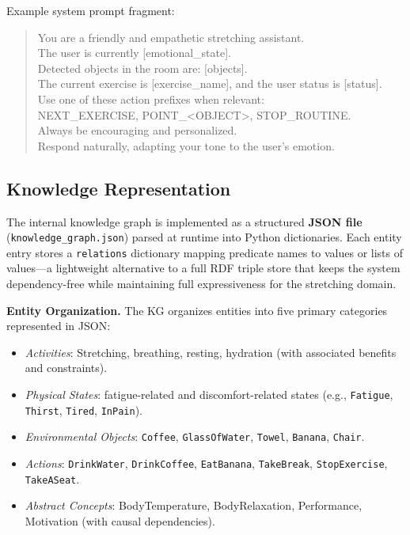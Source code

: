 \documentclass[pdflatex,sn-basic,Numbered,iicol,twocolumn]{sn-jnl}%
\begin{document}
Example system prompt fragment:
\begin{quote}
\small\ttfamily
You are a friendly and empathetic stretching assistant.\\
The user is currently [emotional\_state].\\
Detected objects in the room are: [objects].\\
The current exercise is [exercise\_name], and the user status is [status].\\
Use one of these action prefixes when relevant:\\
NEXT\_EXERCISE, POINT\_<OBJECT>, STOP\_ROUTINE.\\
Always be encouraging and personalized.\\
Respond naturally, adapting your tone to the user's emotion.
\end{quote}

\subsection{Knowledge Representation}

The internal knowledge graph is implemented as a structured \textbf{JSON file} (\texttt{knowledge\_graph.json}) parsed at runtime into Python dictionaries. Each entity entry stores a \texttt{relations} dictionary mapping predicate names to values or lists of values—a lightweight alternative to a full RDF triple store that keeps the system dependency-free while maintaining full expressiveness for the stretching domain.

\textbf{Entity Organization.} The KG organizes entities into five primary categories represented in JSON:

\begin{itemize}
\item \textit{Activities}: Stretching, breathing, resting, hydration (with associated benefits and constraints).
\item \textit{Physical States}: fatigue-related and discomfort-related states (e.g., \texttt{Fatigue}, \texttt{Thirst}, \texttt{Tired}, \texttt{InPain}).
\item \textit{Environmental Objects}: \texttt{Coffee}, \texttt{GlassOfWater}, \texttt{Towel}, \texttt{Banana}, \texttt{Chair}.
\item \textit{Actions}: \texttt{DrinkWater}, \texttt{DrinkCoffee}, \texttt{EatBanana}, \texttt{TakeBreak}, \texttt{StopExercise}, \texttt{TakeASeat}.
\item \textit{Abstract Concepts}: BodyTemperature, BodyRelaxation, Performance, Motivation (with causal dependencies).
\end{itemize}
\end{document}

